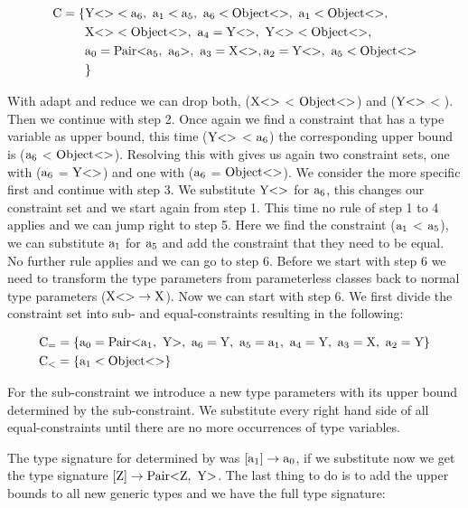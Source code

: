 \begin{align*}
    \text{C} = \{& \nvtt{Y}{} < \fa{6}, \ \fa{1} < \fa{5}, \ \fa{6} < \nvtt{Object}{}, \ \fa{1} < \nvtt{Object}{}, \\
    &\nvtt{X}{} < \nvtt{Object}{}, \ \fa{4} = \nvtt{Y}{}, \ \nvtt{Y}{} < \nvtt{Object}{}, \\
    &\fa{0} = \nvtt{Pair}{\fa{5}, \ \fa{6}}, \ \fa{3} = \nvtt{X}{}, \fa{2} = \nvtt{Y}{}, \ \fa{5} < \nvtt{Object}{} \\
    &\}
\end{align*}

With adapt and reduce we can drop both, ($\text{X} \text{<}  \text{>}$ < $\text{Object} \text{<}  \text{>}$) and ($\text{Y} \text{<}  \text{>}$ < ). Then we continue with step 2.
Once again we find a constraint that has a type variable as upper bound, this time ($\text{Y} \text{<}  \text{>}$ < $\text{a}_{6}$) the corresponding upper bound is ($\text{a}_{6}$ < $\text{Object} \text{<}  \text{>}$).
Resolving this with  gives us again two constraint sets, one with ($\text{a}_{6}$ = $\text{Y} \text{<}  \text{>}$) and one with ($\text{a}_{6}$ = $\text{Object} \text{<}  \text{>}$). We consider the more specific first and continue with step 3.
We substitute $\text{Y} \text{<}  \text{>}$ for $\text{a}_{6}$, this changes our constraint set and we start again from step 1. This time no rule of step 1 to 4 applies and we can jump right to step 5.
Here we find the constraint ($\text{a}_{1}$ < $\text{a}_{5}$), we can substitute $\text{a}_{1}$ for $\text{a}_{5}$ and add the constraint that they need to be equal.
No further rule applies and we can go to step 6. Before we start with step 6 we need to transform the type parameters from parameterless classes back to normal type parameters ($\text{X} \text{<}  \text{>} \to \text{X}$). Now we can start with step 6. We first divide the constraint set into sub- and equal-constraints resulting in the following:

\begin{align*}
    \text{C}_= &= \{ \fa{0} = \nvtt{Pair}{\fa{1}, \ \text{Y}}, \ \fa{6} = \text{Y}, \ \fa{5} = \fa{1}, \ \fa{4} = \text{Y}, \ \fa{3} = \text{X}, \ \fa{2} = \text{Y} \}\\
    \text{C}_< &= \{ \fa{1} < \nvtt{Object}{} \}
\end{align*}

For the sub-constraint we introduce a new type parameters  with its upper bound determined by the sub-constraint.
We substitute every right hand side of all equal-constraints until there are no more occurrences of type variables.

The type signature for  determined by  was $[\text{a}_{1}] \to \text{a}_{0}$, if we substitute now we get the type signature $[\text{Z}] \to \text{Pair} \text{<} \text{Z}, \ \text{Y} \text{>}$.
The last thing to do is to add the upper bounds to all new generic types and we have the full type signature:

